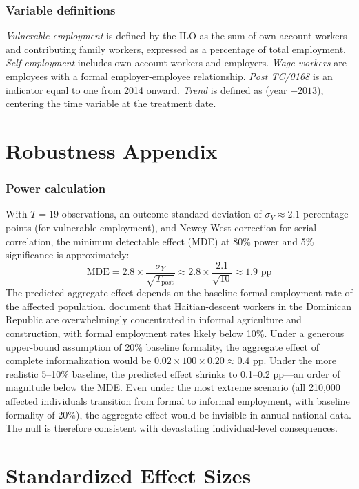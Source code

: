 \documentclass[12pt]{article}
\begin{document}
\subsubsection*{Variable definitions}
\textit{Vulnerable employment} is defined by the ILO as the sum of own-account workers and contributing family workers, expressed as a percentage of total employment. \textit{Self-employment} includes own-account workers and employers. \textit{Wage workers} are employees with a formal employer-employee relationship. \textit{Post TC/0168} is an indicator equal to one from 2014 onward. \textit{Trend} is defined as (year $- 2013$), centering the time variable at the treatment date.

\section{Robustness Appendix}

\subsubsection*{Power calculation}
With $T = 19$ observations, an outcome standard deviation of $\sigma_Y \approx 2.1$ percentage points (for vulnerable employment), and Newey-West correction for serial correlation, the minimum detectable effect (MDE) at 80\% power and 5\% significance is approximately:
\[
\text{MDE} = 2.8 \times \frac{\sigma_Y}{\sqrt{T_{\text{post}}}} \approx 2.8 \times \frac{2.1}{\sqrt{10}} \approx 1.9 \text{ pp}
\]
The predicted aggregate effect depends on the baseline formal employment rate of the affected population. \citet{amuedo2017dominican} document that Haitian-descent workers in the Dominican Republic are overwhelmingly concentrated in informal agriculture and construction, with formal employment rates likely below 10\%. Under a generous upper-bound assumption of 20\% baseline formality, the aggregate effect of complete informalization would be $0.02 \times 100 \times 0.20 \approx 0.4$ pp. Under the more realistic 5--10\% baseline, the predicted effect shrinks to 0.1--0.2 pp---an order of magnitude below the MDE. Even under the most extreme scenario (all 210,000 affected individuals transition from formal to informal employment, with baseline formality of 20\%), the aggregate effect would be invisible in annual national data. The null is therefore consistent with devastating individual-level consequences.

\section{Standardized Effect Sizes}
\label{sec:sde}


\end{document}
